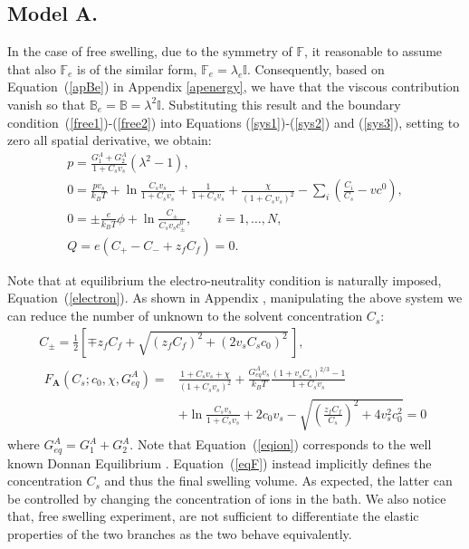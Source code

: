 \documentclass[runningheads]{llncs}
\newcommand{\F}{\ensuremath{\mathbb{F}}}
\newcommand{\B}{\ensuremath{\mathbb{B}}}
\begin{document}
\subsection{Model A.}
In the case of free swelling, due to the symmetry of $\F$, it reasonable to assume that also $\F_e$ is of the similar form, $\F_e=\lambda_e \mathbb{I}$. Consequently, based on Equation~(\ref{apBe}) in Appendix \ref{apenergy}, we have that the viscous contribution vanish so that $\B_e=\B= \lambda^2 \mathbb{I}$. Substituting this result and the boundary condition~(\ref{free1})-(\ref{free2}) into Equations (\ref{sys1})-(\ref{sys2}) and (\ref{sys3}), setting to zero all spatial derivative, we obtain:
\begin{gather}
p = \frac{G^A_1+G^A_2}{1+C_sv_s}(\lambda^2-1),\label{presA}\\
0 = \frac{pv_s}{k_BT} + \ln \frac{C_s v_s}{1+C_s v_s} + \frac{1}{1+C_sv_s} +\frac{\chi}{(1+C_s v_s)^2}-\sum_i \left(\frac{C_i}{C_s}-vc^0\right), \\[2mm]
0 = \pm\frac{e}{k_B T} \phi  + \ln \frac{C_\pm}{C_s v_s c_\pm^0},\qquad i=1,\ldots,N,\\[2.5mm]
Q = e\left(C_+-C_-+z_f C_{f}\right)=0.\label{electron}
\end{gather}

Note that at equilibrium the electro-neutrality condition is naturally imposed, Equation~(\ref{electron}). As shown in Appendix , manipulating the above system we can reduce the number of unknown to the solvent concentration $C_s$:
\begin{gather}
C_{\pm}= \frac{1}{2}\left[\mp z_fC_f+ \sqrt{(z_fC_f)^2+(2v_sC_sc_0)^2}\,\right],\label{eqion}\\
\begin{aligned}
F_{\mathbf{A}}(C_s; c_0,\chi,G^A_{eq})=&\frac{1+C_sv_s+\chi}{(1+C_sv_s)^2}+\frac{G^A_{eq} v_s}{k_BT} \frac{(1+v_sC_s)^{2/3}-1}{1+C_sv_s}\\[1.5mm]
&+\ln \frac{C_sv_s}{1+C_sv_s} +2c_0v_s-\sqrt{\left(\frac{z_fC_f}{C_s}\right)^2+4v_s^2c^2_0} =0 \label{eqF}
\end{aligned}
\end{gather}
where $G^A_{eq}=G^A_1+G^A_2$. Note that Equation~(\ref{eqion}) corresponds to the well known Donnan Equilibrium \cite{DROZDOVph}. Equation~(\ref{eqF}) instead implicitly defines the concentration $C_s$ and thus the final swelling volume. As expected, the latter can be controlled by changing the concentration of ions in the bath. We also notice that, free swelling experiment, are not sufficient to differentiate the elastic properties of the two branches as the two behave equivalently.
\end{document}
